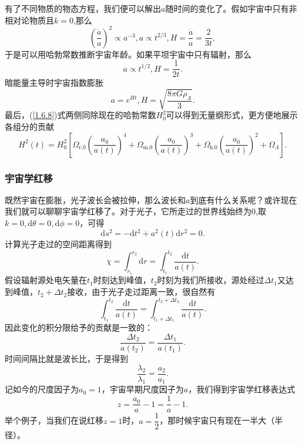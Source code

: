 \documentclass[../天体物理基础.tex]{subfiles}
\begin{document}
有了不同物质的物态方程，我们便可以解出$a$随时间的变化了。假如宇宙中只有非相对论物质且$k=0$,那么
\begin{equation}
\left(\frac{\dot{a}}{a}\right)^{2}\propto{}a^{-3},a\propto{}t^{2/3},H=\frac{\dot{a}}{a}=\frac{2}{3t},
\end{equation}
于是可以用哈勃常数推断宇宙年龄。如果平坦宇宙中只有辐射，那么
\begin{equation}
a\propto{}t^{1/2},H=\frac{1}{2t}.
\end{equation}
暗能量主导时宇宙指数膨胀
\begin{equation}
a=e^{Ht},H=\sqrt{\frac{8\pi G\rho_{\Lambda}}{3}}.
\end{equation}
最后，(\ref{1.6.8})式两侧同除现在的哈勃常数$H_{0}^{2}$可以得到无量纲形式，更方便地展示各组分的贡献
\begin{equation}
H^{2}\left(t\right)=H_{0}^{2}\left[\Omega_{\text{r,0}}\left(\frac{a_{0}}{a\left(t\right)}\right)^{4}+\Omega_{\text{m,0}}\left(\frac{a_{0}}{a\left(t\right)}\right)^{3}+\Omega_{\text{k,0}}\left(\frac{a_{0}}{a\left(t\right)}\right)^{2}+\Omega_{\Lambda}\right].
\end{equation}

\subsubsection{宇宙学红移}
既然宇宙在膨胀，光子波长会被拉伸，那么波长和$a$到底有什么关系呢？或许现在我们就可以聊聊宇宙学红移了。对于光子，它所走过的世界线始终为0,取$k=0,\mathrm{d}\theta=0,\mathrm{d}\phi=0$，可得
\begin{equation}
\mathrm{d}s^{2}=-\mathrm{d}t^{2}+a^{2}\left(t\right)\mathrm{d}r^{2}=0.
\end{equation}
计算光子走过的空间距离得到
\begin{equation}
\chi=\int_{r_{1}}^{r_{2}}\mathrm{d}r=\int_{t_{1}}^{t_{2}}\frac{\mathrm{d}t}{a\left(t\right)}.
\end{equation}
假设辐射源处电矢量在$t_{1}$时刻达到峰值，$t_{2}$时刻为我们所接收，源处经过$\Delta{}t_{1}$又达到峰值，$t_{2}+\Delta{}t_{2}$接收，由于光子走过距离一致，很自然有
\begin{equation}
\int_{t_{1}}^{t_{2}}\frac{\mathrm{d}t}{a\left(t\right)}=\int_{t_{1}+\Delta{}t_{1}}^{t_{2}+\Delta{}t_{2}}\frac{\mathrm{d}t}{a\left(t\right)}.
\end{equation}
因此变化的积分限给予的贡献是一致的：
\begin{equation}
\frac{\Delta{}t_{2}}{a\left(t_{2}\right)}=\frac{\Delta{}t_{1}}{a\left(t_{1}\right)}.
\end{equation}
时间间隔比就是波长比，于是得到
\begin{equation}
\frac{\lambda_{2}}{\lambda_{1}}=\frac{a_{2}}{a_{1}}.
\end{equation}
记如今的尺度因子为$a_{0}=1$，宇宙早期尺度因子为$a$，我们得到宇宙学红移表达式
\begin{equation}
z=\frac{a_{0}}{a}-1=\frac{1}{a}-1.
\end{equation}
举个例子，当我们在说红移$z=1$时，$a=\dfrac12$，那时候宇宙只有现在一半大（半径）。
\end{document}
